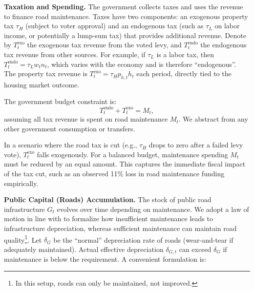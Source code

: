 {\bf Taxation and Spending.}
The government collects taxes and uses the revenue to finance road maintenance. Taxes have two components: an exogenous property tax $\tau_H$ (subject to voter approval) and an endogenous tax (such as $\tau_L$ on labor income, or potentially a lump-sum tax) that provides additional revenue. Denote by $T^{\text{exo}}_t$ the exogenous tax revenue from the voted levy, and $T^{\text{endo}}_t$ the endogenous tax revenue from other sources. For example, if $\tau_L$ is a labor tax, then $T^{\text{endo}}_t = \tau_L w_t n_t$, which varies with the economy and is therefore “endogenous”. The property tax revenue is $T^{\text{exo}}_t = \tau_H p_{h,t} h_t$ each period, directly tied to the housing market outcome.

The government budget constraint is:
\begin{equation}
T^{\text{endo}}_t + T^{\text{exo}}_t = M_t,
\end{equation}
assuming all tax revenue is spent on road maintenance $M_t$. We abstract from any other government consumption or transfers.

In a scenario where the road tax is cut (e.g., $\tau_H$ drops to zero after a failed levy vote), $T^{\text{exo}}_t$ falls exogenously. For a balanced budget, maintenance spending $M_t$ must be reduced by an equal amount. This captures the immediate fiscal impact of the tax cut, such as an observed 11\% loss in road maintenance funding empirically.



{\bf Public Capital (Roads) Accumulation.}
The stock of public road infrastructure $G_t$ evolves over time depending on maintenance. We adopt a law of motion in line with \cite{rioja2003} to formalize how insufficient maintenance leads to infrastructure depreciation, whereas sufficient maintenance can maintain road quality\footnote{In this setup, roads can only be maintained, not improved.}. Let $\delta_G$ be the “normal” depreciation rate of roads (wear-and-tear if adequately maintained). Actual effective depreciation $\delta_{G,t}$ can exceed $\delta_G$ if maintenance is below the requirement. A convenient formulation is:

